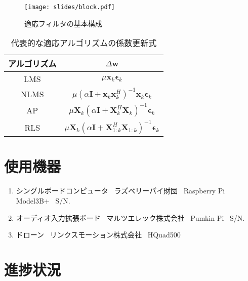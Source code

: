 \documentclass[a4paper, twocolumn]{ltjsarticle}
\begin{document}
  \begin{figure}[h]
    \centering
    \texttt{[image: slides/block.pdf]} \\
    \caption{適応フィルタの基本構成}
    \label{fig:block}
  \end{figure}

  \begin{table}[h]
    \centering
    \caption{代表的な適応アルゴリズムの係数更新式}
    \label{tab:formula}
    \begin{tabular}{|c|c|}
    \hline
    アルゴリズム  & \(\Delta \symbf{w}\)                                                                                             \\ \hline
    LMS         & \( \mu \symbf{x}_k \symbf{\epsilon}_k \)                                                                         \\ \hline
    NLMS        & \( \mu \left( \alpha \symbf{I} + \symbf{x}_k \symbf{x}_k^H \right)^{-1} \symbf{x}_k \symbf{\epsilon}_k \)        \\ \hline
    AP          & \(\mu \symbf{X}_k \left( \alpha \symbf{I} + \symbf{X}_k^H \symbf{X}_k \right)^{-1} \symbf{\epsilon}_k\)          \\ \hline
    RLS         & \( \mu \symbf{X}_k \left( \alpha \symbf{I} + \symbf{X}_{1:k}^H \symbf{X}_{1:k} \right)^{-1} \symbf{\epsilon}_k\) \\ \hline
    \end{tabular}
  \end{table}


\section{使用機器}
\begin{enumerate}
  \renewcommand{\labelenumi}{(\arabic{enumi})}
  \item シングルボードコンピュータ \ ラズベリーパイ財団 \ Raspberry Pi Model3B+ \ S/N.
  \item オーディオ入力拡張ボード \ マルツエレック株式会社 \ Pumkin Pi \ S/N.
  \item ドローン \ リンクスモーション株式会社 \ HQuad500
\end{enumerate}  

\section{進捗状況}
\end{document}

